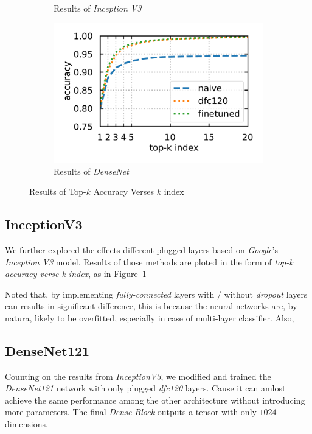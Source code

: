 \documentclass{article}
\begin{document}
\begin{figure}[htb]
\begin{subfigure}{0.48\linewidth}
		\caption{Results of \emph{Inception V3}}
		\label{fig:incetionp}
	\end{subfigure} 
	\begin{subfigure}{0.48\linewidth}
		\centering
		\includegraphics[width=\linewidth]{pics/DenseNet}
		\caption{Results of \emph{DenseNet}}
		\label{fig:densenet}
	\end{subfigure} 
	
	\caption{Results of Top-$k$ Accuracy Verses $k$ index}
\end{figure}


\subsection{InceptionV3}
We further explored the effects different plugged layers based on \emph{Google}'s \emph{Inception V3} model. 
Results of those methods are ploted in the form of \emph{top-k accuracy verse k index}, as in Figure~\ref{fig:incetionp}

Noted that, by implementing \emph{fully-connected} layers with / without \emph{dropout} layers can results in significant difference, 
this is because the neural networks are, by natura, likely to be overfitted, especially in case of multi-layer classifier. 
Also, 

\subsection{DenseNet121}
Counting on the results from \emph{InceptionV3}, we modified and trained the \emph{DenseNet121} network with only plugged \emph{dfc120} layers. Cause it can amlost achieve the same performance among the other architecture without introducing more parameters. 
The final \emph{Dense Block} outputs a tensor with only $1024$ dimensions, 
\end{document}
